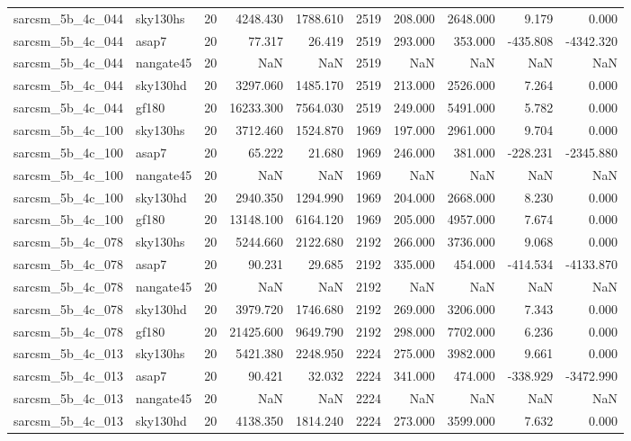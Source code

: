 \begin{longtable}{llrrrrrrrr}
sarcsm\_5b\_4c\_044 & sky130hs & 20 & 4248.430 & 1788.610 & 2519 & 208.000 & 2648.000 & 9.179 & 0.000 \\
sarcsm\_5b\_4c\_044 & asap7 & 20 & 77.317 & 26.419 & 2519 & 293.000 & 353.000 & -435.808 & -4342.320 \\
sarcsm\_5b\_4c\_044 & nangate45 & 20 & NaN & NaN & 2519 & NaN & NaN & NaN & NaN \\
sarcsm\_5b\_4c\_044 & sky130hd & 20 & 3297.060 & 1485.170 & 2519 & 213.000 & 2526.000 & 7.264 & 0.000 \\
sarcsm\_5b\_4c\_044 & gf180 & 20 & 16233.300 & 7564.030 & 2519 & 249.000 & 5491.000 & 5.782 & 0.000 \\
sarcsm\_5b\_4c\_100 & sky130hs & 20 & 3712.460 & 1524.870 & 1969 & 197.000 & 2961.000 & 9.704 & 0.000 \\
sarcsm\_5b\_4c\_100 & asap7 & 20 & 65.222 & 21.680 & 1969 & 246.000 & 381.000 & -228.231 & -2345.880 \\
sarcsm\_5b\_4c\_100 & nangate45 & 20 & NaN & NaN & 1969 & NaN & NaN & NaN & NaN \\
sarcsm\_5b\_4c\_100 & sky130hd & 20 & 2940.350 & 1294.990 & 1969 & 204.000 & 2668.000 & 8.230 & 0.000 \\
sarcsm\_5b\_4c\_100 & gf180 & 20 & 13148.100 & 6164.120 & 1969 & 205.000 & 4957.000 & 7.674 & 0.000 \\
sarcsm\_5b\_4c\_078 & sky130hs & 20 & 5244.660 & 2122.680 & 2192 & 266.000 & 3736.000 & 9.068 & 0.000 \\
sarcsm\_5b\_4c\_078 & asap7 & 20 & 90.231 & 29.685 & 2192 & 335.000 & 454.000 & -414.534 & -4133.870 \\
sarcsm\_5b\_4c\_078 & nangate45 & 20 & NaN & NaN & 2192 & NaN & NaN & NaN & NaN \\
sarcsm\_5b\_4c\_078 & sky130hd & 20 & 3979.720 & 1746.680 & 2192 & 269.000 & 3206.000 & 7.343 & 0.000 \\
sarcsm\_5b\_4c\_078 & gf180 & 20 & 21425.600 & 9649.790 & 2192 & 298.000 & 7702.000 & 6.236 & 0.000 \\
sarcsm\_5b\_4c\_013 & sky130hs & 20 & 5421.380 & 2248.950 & 2224 & 275.000 & 3982.000 & 9.661 & 0.000 \\
sarcsm\_5b\_4c\_013 & asap7 & 20 & 90.421 & 32.032 & 2224 & 341.000 & 474.000 & -338.929 & -3472.990 \\
sarcsm\_5b\_4c\_013 & nangate45 & 20 & NaN & NaN & 2224 & NaN & NaN & NaN & NaN \\
sarcsm\_5b\_4c\_013 & sky130hd & 20 & 4138.350 & 1814.240 & 2224 & 273.000 & 3599.000 & 7.632 & 0.000 \\

\end{longtable}
